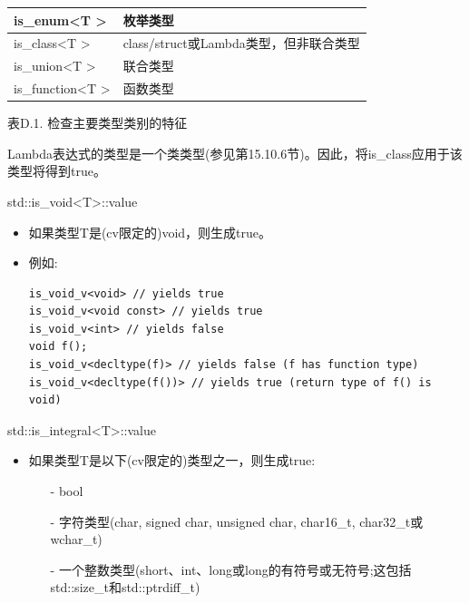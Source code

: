 \begin{table}[H]
\begin{tabular}{|l|l|}
		is\_enum\textless{}T \textgreater{}                      & 枚举类型                                                                         \\ \hline
		is\_class\textless{}T \textgreater{}                     & class/struct或Lambda类型，但非联合类型                                                               \\ \hline
		is\_union\textless{}T \textgreater{}                     & 联合类型                                                                                                    \\ \hline
		is\_function\textless{}T \textgreater{}                  & 函数类型                                                                                                  \\ \hline
	\end{tabular}
\end{table}

\begin{center}
表D.1. 检查主要类型类别的特征
\end{center}

Lambda表达式的类型是一个类类型(参见第15.10.6节)。因此，将is\_class应用于该类型将得到true。

std::is\_void<T>::value

\begin{itemize}
\item 
如果类型T是(cv限定的)void，则生成true。

\item 
例如:
\begin{lstlisting}[style=styleCXX]
is_void_v<void> // yields true
is_void_v<void const> // yields true
is_void_v<int> // yields false
void f();
is_void_v<decltype(f)> // yields false (f has function type)
is_void_v<decltype(f())> // yields true (return type of f() is void)
\end{lstlisting}

\end{itemize}

std::is\_integral<T>::value

\begin{itemize}
\item 
如果类型T是以下(cv限定的)类型之一，则生成true:

\begin{itemize}
\item [-]
bool

\item [-]
字符类型(char, signed char, unsigned char, char16\_t, char32\_t或wchar\_t)

\item [-]
一个整数类型(short、int、long或long的有符号或无符号;这包括std::size\_t和std::ptrdiff\_t)
\end{itemize}

\end{itemize}

